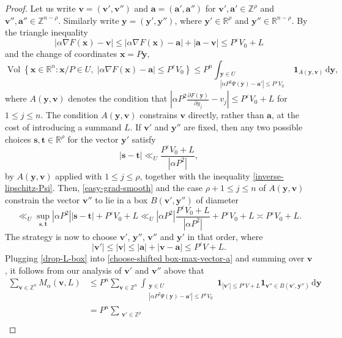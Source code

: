 \documentclass[a4paper,11pt, twoside,reqno]{amsart}
\theoremstyle{plain}
\theoremstyle{definition}
\theoremstyle{remark}
\newcommand{\bfv}{\bm{v}}
\newcommand{\bfx}{\bm{x}}
\newcommand{\bfy}{\bm{y}}
\newcommand{\ZZ}{\mathbb{Z}}
\newcommand{\RR}{\mathbb{R}}
\DeclareMathOperator{\meas}{Vol}
\newcommand{\dd}{\mathrm{d}}
\newcommand{\ve}{\varepsilon}
\renewcommand{\le}{\leqslant}
\renewcommand{\leq}{\leqslant}
\numberwithin{equation}{section}
\begin{document}
\begin{proof}
Let us write $\bfv=(\bfv',\bfv'')$
and $\bm{a}=(\bm{a}',\bm{a}'')$
for $\bfv',\bm{a}'\in \ZZ^\rho$ and $\bfv'',\bm{a}''\in \ZZ^{n-\rho}$.
Similarly write $\bm{y}=(\bm{y}',\bm{y}'')$,
where $\bm{y}'\in \RR^\rho$ and $\bm{y}''\in \RR^{n-\rho}$.
By the triangle inequality
$$|\alpha\nabla F(\bm{x})-\bm{v}|
\le |\alpha\nabla F(\bm{x})-\bm{a}| + |\bm{a}-\bm{v}|
\le P^\ve V_0 + L$$
and the change of coordinates $\bm{x}=P\bm{y}$,
\begin{equation}
\label{drop-L-box}
\meas\left\{
\bfx\in\RR^n:
\bfx/P\in U,\;
|\alpha\nabla F(\bm{x})-\bm{a}|\leq P^\varepsilon V_0
\right\}
\le P^n \int_{\substack{\bfy\in U\\
|\alpha P^2\Psi(\bm{y})-\bm{a}'|\leq P^\varepsilon V_0}}
\bm{1}_{A(\bm{y},\bm{v})}\,
\dd\bm{y},
\end{equation}
where $A(\bm{y},\bm{v})$ denotes the condition that
$|\alpha P^2 \frac{\partial F(\bfy)}{\partial y_j}  
-v_j|\leq P^\varepsilon V_0 + L$ for $1\leq j\leq n$.
The condition $A(\bm{y},\bm{v})$ constrains $\bm{v}$ directly,
rather than $\bm{a}$,
at the cost of introducing a summand $L$.
If $\bm{v}'$ and $\bm{y}''$ are fixed,
then any two possible choices $\bm{s},\bm{t}\in \RR^\rho$ for the vector
$\bm{y}'$ satisfy $$|\bm{s}-\bm{t}|\ll_U \frac{P^\varepsilon V_0 + L}{|\alpha P^2|},$$
by $A(\bm{y},\bm{v})$ applied with $1\le j\le \rho$,
together with the inequality \eqref{inverse-lipschitz-Psi}.
Then, \eqref{easy-grad-smooth} and
the case $\rho+1\le j\le n$ of $A(\bm{y},\bm{v})$
constrain the vector $\bm{v}''$ to lie in a box
$B(\bm{v}',\bm{y}'')$
of diameter
$$\ll_U \sup_{\bm{s},\bm{t}} |\alpha P^2| |\bm{s}-\bm{t}|
+ P^\varepsilon V_0 + L
\ll_U |\alpha P^2| \frac{P^\varepsilon V_0 + L}{|\alpha P^2|}
+ P^\varepsilon V_0 + L
\asymp P^\varepsilon V_0 + L.$$
The strategy is now to
choose $\bm{v}'$, $\bm{y}''$, $\bm{v}''$ and $\bm{y}'$ in that order,
where $$|\bm{v}'|\le |\bm{v}|\le |\bm{a}| + |\bm{v}-\bm{a}| \le P^\ve V + L.$$
Plugging \eqref{drop-L-box} into \eqref{choose-shifted box-max-vector-a}
and summing over $\bfv$,
it follows from our analysis of $\bm{v}'$ and $\bm{v}''$ above that
\begin{equation*}
\begin{split}
\sum_{\bm{v}\in \ZZ^n}
M_\alpha(\bm{v},L)
&\le P^n \sum_{\bm{v}\in \ZZ^n} \int_{\substack{\bm{y}\in U\\
|\alpha P^2\Psi(\bm{y})-\bm{a}'|\leq P^\varepsilon V_0}}
\bm{1}_{|\bm{v}'| \le P^\ve V + L}
\bm{1}_{\bm{v}''\in B(\bm{v}',\bm{y}'')}\,
\dd\bm{y} \\
&= P^n \sum_{\substack{\bm{v}'\in \ZZ^\rho\\ 
}}
\end{split}
\end{equation*}
\end{proof}
\end{document}
